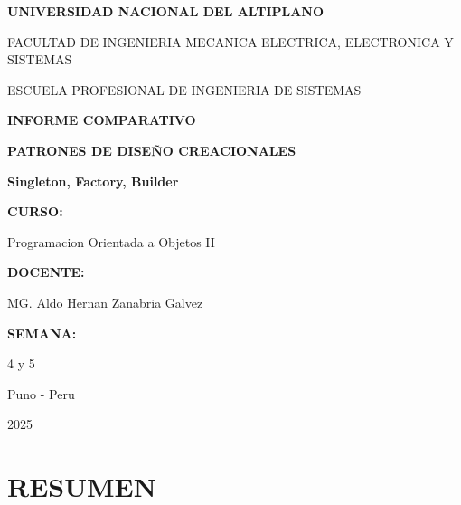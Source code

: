 \documentclass[11pt,a4paper]{article}
\begin{document}
\begin{titlepage}
    \centering
    
    \vspace*{1cm}
    
    {\LARGE\bfseries UNIVERSIDAD NACIONAL DEL ALTIPLANO\par}
    \vspace{0.5cm}
    {\Large FACULTAD DE INGENIERIA MECANICA ELECTRICA, ELECTRONICA Y SISTEMAS\par}
    \vspace{0.5cm}
    {\large ESCUELA PROFESIONAL DE INGENIERIA DE SISTEMAS\par}
    
    \vspace{2cm}
    
    {\large\textbf{INFORME COMPARATIVO}\par}
    {\large\textbf{PATRONES DE DISEÑO CREACIONALES}\par}
    {\large\textbf{Singleton, Factory, Builder}\par}
    
    \vspace{1.5cm}
    
    {\Large\textbf{CURSO:}\par}
    {\large Programacion Orientada a Objetos II\par}
    
    \vspace{1cm}
    
    {\Large\textbf{DOCENTE:}\par}
    {\large MG. Aldo Hernan Zanabria Galvez\par}
    
    \vspace{1cm}
    
    {\Large\textbf{SEMANA:}\par}
    {\large 4 y 5\par}
    
    \vfill
    
    {\large Puno - Peru\par}
    {\large 2025\par}
    
\end{titlepage}

\newpage
\setcounter{page}{1}

\section*{RESUMEN}
\end{document}
